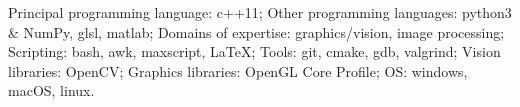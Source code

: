 
\begin{cvskills}
  \cvskill
    {Principal programming language:}
    {c++11;}
  \cvskill
    {Other programming languages:}
    {python3 \& NumPy, glsl, matlab;}
  \cvskill
    {Domains of expertise:}
    {graphics/vision, image processing;}
  \cvskill
    {Scripting:}
    {bash, awk, maxscript, LaTeX;}
  \cvskill
    {Tools:}
    {git, cmake, gdb, valgrind;}
  \cvskill
    {Vision libraries:}
    {OpenCV;}
  \cvskill
    {Graphics libraries:}
    {OpenGL Core Profile;}
  \cvskill
    {OS:}
    {windows, macOS, linux.}
\end{cvskills}

\begin{center}
\vspace{10.0mm}
\end{center}

%
